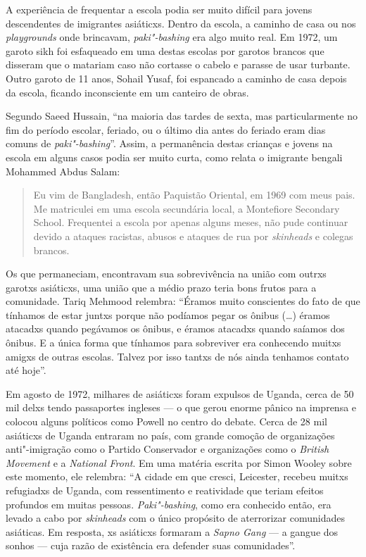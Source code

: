 A experiência de frequentar a escola podia ser muito difícil para jovens descendentes de imigrantes asiáticxs. Dentro da escola, a caminho de casa ou nos \emph{playgrounds} onde brincavam, \emph{paki"-bashing} era algo muito real. Em 1972, um garoto sikh foi esfaqueado em uma destas escolas por garotos brancos que disseram que o matariam caso não cortasse o cabelo e parasse de usar turbante. Outro garoto de 11 anos, Sohail Yusaf, foi espancado a caminho de casa depois da escola, ficando inconsciente em um canteiro de obras.

Segundo Saeed Hussain, ``na maioria das tardes de sexta, mas particularmente no fim do período escolar, feriado, ou o último dia antes do feriado eram dias comuns de \emph{paki"-bashing}''. Assim, a permanência destas crianças e jovens na escola em alguns casos podia ser muito curta, como relata o imigrante bengali Mohammed Abdus Salam:

\begin{quote}
Eu vim de Bangladesh, então Paquistão Oriental, em 1969 com meus pais. Me matriculei em uma escola secundária local, a Montefiore Secondary School. Frequentei a escola por apenas alguns meses, não pude continuar devido a ataques racistas, abusos e ataques de rua por \emph{skinheads} e colegas brancos.
\end{quote}

Os que permaneciam, encontravam sua sobrevivência na união com outrxs garotxs asiáticxs, uma união que a médio prazo teria bons frutos para a comunidade. Tariq Mehmood relembra: ``Éramos muito conscientes do fato de que tínhamos de estar juntxs porque não podíamos pegar os ônibus (\ldots{}) éramos atacadxs quando pegávamos os ônibus, e éramos atacadxs quando saíamos dos ônibus. E a única forma que tínhamos para sobreviver era conhecendo muitxs amigxs de outras escolas. Talvez por isso tantxs de nós ainda tenhamos contato até hoje''.

Em agosto de 1972, milhares de asiáticxs foram expulsos de Uganda, cerca de 50 mil delxs tendo passaportes ingleses --- o que gerou enorme pânico na imprensa e colocou alguns políticos como Powell no centro do debate. Cerca de 28 mil asiáticxs de Uganda entraram no país, com grande comoção de organizações anti"-imigração como o Partido Conservador e organizações como o \emph{British Movement} e a \emph{National Front}. Em uma matéria escrita por Simon Wooley sobre este momento, ele relembra: ``A cidade em que cresci, Leicester, recebeu muitxs refugiadxs de Uganda, com ressentimento e reatividade que teriam efeitos profundos em muitas pessoas. \emph{Paki"-bashing}, como era conhecido então, era levado a cabo por \emph{skinheads} com o único propósito de aterrorizar comunidades asiáticas. Em resposta, xs asiáticxs formaram a \emph{Sapno Gang} --- a gangue dos sonhos --- cuja razão de existência era defender suas comunidades''.

